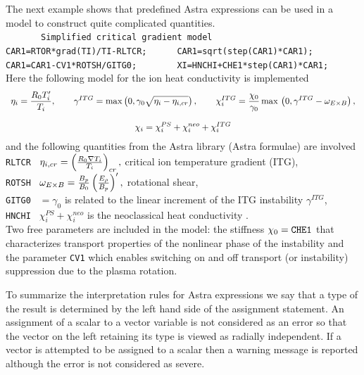 The next example shows that predefined Astra expressions can be used in
a model to construct quite complicated quantities.
{\tt%
\smallskip\\
\hspace*{1mm}
~~~~~~~Simplified critical gradient model
\smallskip\\
CAR1=RTOR*grad(TI)/TI-RLTCR;~~~~~~CAR1=sqrt(step(CAR1)*CAR1);
\smallskip\\
CAR1=CAR1-CV1*ROTSH/GITG0;~~~~~~~~XI=HNCHI+CHE1*step(CAR1)*CAR1;
}\medskip\\
Here the following model for the ion heat conductivity is implemented
$$
\begin{array}{c}\ds
\eta_i=\frac{R_0 T_i'}{T_i}
,\qq
\gamma^{ITG}={\rm max}\lb(0,\gamma_0\sqrt{\eta_i-\eta_{i,cr}}\rb)
,\qq
\chi_i^{ITG}
=\frac{\chi_0}{\gamma_0}\,
{\rm max}\,\lb(0,\gamma^{ITG}-\omega_{E\x B}\rb)
,\bigskip\\ \ds
\chi_i=\chi_i^{PS}+\chi_i^{neo}+\chi_i^{ITG}
\end{array}
$$
and the following quantities from the Astra library (Astra formulae) are
involved\\  
\hspace*{3mm}
{\tt RLTCR~} $\eta_{i,cr}=\left(\frac{R_0\nabla T_i}{T_i}\right)_{cr},$ 
critical ion temperature gradient (ITG),\\
\hspace*{3mm}
{\tt ROTSH~} $\omega_{E\times
B}=\frac{B_p}{B_0}\left(\frac{E_\rho}{B_p}\right)',$\label{ROTSH} 
rotational shear,\\
\hspace*{3mm}
{\tt GITG0~} $=\gamma_0$ is related to the
linear increment of the ITG instability $\gamma^{ITG}$,\\
\hspace*{3mm}
{\tt HNCHI~} $\chi_i^{PS}+\chi_i^{neo}$ is the
neoclassical heat conductivity \cite{CH}.\\ 
Two free parameters are included in the model:
the stiffness $\chi_0=\tt CHE1$ 
that characterizes transport properties of the nonlinear phase of the
instability and the parameter {\tt CV1} which enables switching on and
off transport (or
instability) suppression due to the plasma rotation. 

To summarize the interpretation rules for Astra expressions we say that
a type of the result is determined by the left hand side of the
assignment statement. 
An assignment of a scalar to a vector variable is not considered as an
error so that the vector on the left retaining its type is viewed as
radially independent.
If a vector is attempted to be assigned to a scalar then a warning
message is reported although the error is not considered as severe.


